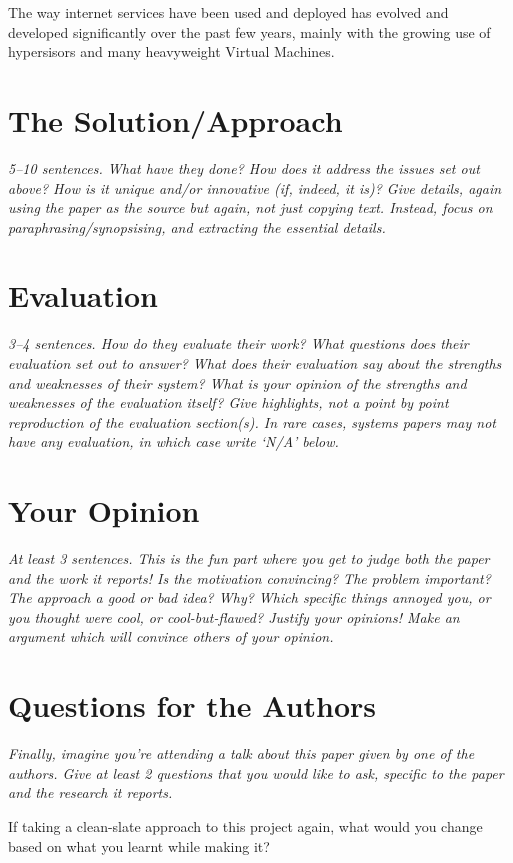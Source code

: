 \documentclass[11pt]{article}
\begin{document}
The way internet services have been used and deployed has evolved and developed
significantly over the past few years, mainly with the growing use of
hypersisors and many heavyweight Virtual Machines.


\section*{The Solution/Approach}

\textsl{5--10 sentences. What have they done? How does it address the issues set out above? How is it unique and/or innovative (if, indeed, it is)? Give details, again using the paper as the source but again, not just copying text. Instead, focus on paraphrasing/synopsising, and extracting the essential details.}


\section*{Evaluation}

\textsl{3--4 sentences. How do they evaluate their work? What questions does their evaluation set out to answer? What does their evaluation say about the strengths and weaknesses of their system? What is your opinion of the strengths and weaknesses of the evaluation itself?  Give highlights, not a point by point reproduction of the evaluation section(s). In rare cases, systems papers may not have any evaluation, in which case write `N/A' below.}


\section*{Your Opinion}

\textsl{At least 3 sentences. This is the fun part where you get to judge both the paper and the work it reports! Is the motivation convincing? The problem important? The approach a good or bad idea?  Why? Which specific things annoyed you, or you thought were cool, or cool-but-flawed? Justify your opinions! Make an argument  which will convince others of your opinion.}


\section*{Questions for the Authors}

\textsl{Finally, imagine you're attending a talk about this paper given by one of the authors. Give at least 2 questions that you would like to ask, specific to the paper and the research it reports.}

If taking a clean-slate approach to this project again, what would you change
based on what you learnt while making it?




\end{document}
